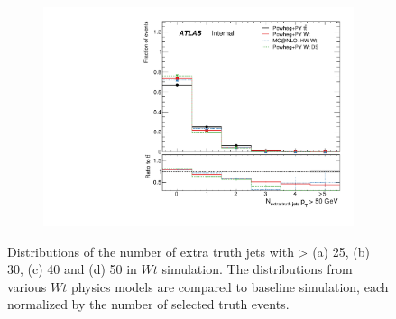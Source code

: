 \begin{figure}
\begin{subfigure}[]{0.45\textwidth}
\end{subfigure}
\begin{subfigure}[]{0.45\textwidth}
\includegraphics[width=\textwidth]{fig/MCComp/WtNTruthExtraJets50.pdf}
\end{subfigure}
\caption{Distributions of the number of extra truth jets with \pt > (a) 25, (b) 30, (c) 40 and (d) 50 \GeV in $Wt$ simulation. The distributions from various $Wt$ physics models are compared to \ttbar baseline simulation, each normalized by the number of selected truth events.}
\label{fig:wtntruthjets}
\end{figure}
